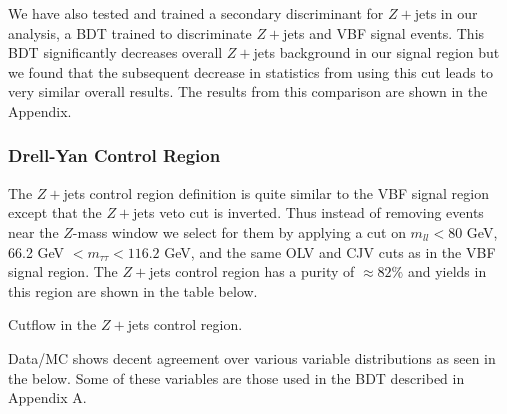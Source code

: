 We have also tested and trained a secondary discriminant for $Z+$jets in our analysis, a BDT trained to discriminate $Z+$jets and VBF signal events. This BDT significantly decreases overall $Z+$jets background in our signal region but we found that the subsequent decrease in statistics from using this cut leads to very similar overall results. The results from this comparison are shown in the Appendix. 

\subsubsection{Drell-Yan Control Region}

The $Z+$jets control region definition is quite similar to the VBF signal region except that the $Z+$jets veto cut is inverted. Thus instead of removing events near the $Z$-mass window we select for them by applying a cut on $m_{ll}<80$ GeV,  66.2 GeV $< m_{\tau\tau}< 116.2$ GeV, and the same OLV and CJV cuts as in the VBF signal region. The $Z+$jets control region has a purity of $\approx 82\%$ and yields in this region are shown in the table below.

\begin{table}[h!]
\scalebox{0.35}{

}
\caption{Cutflow in the $Z+$jets control region.}
\label{tab:zttcr}
\end{table}

Data/MC shows decent agreement over various variable distributions as seen in the  below. Some of these variables are those used in the BDT described in Appendix A. 

